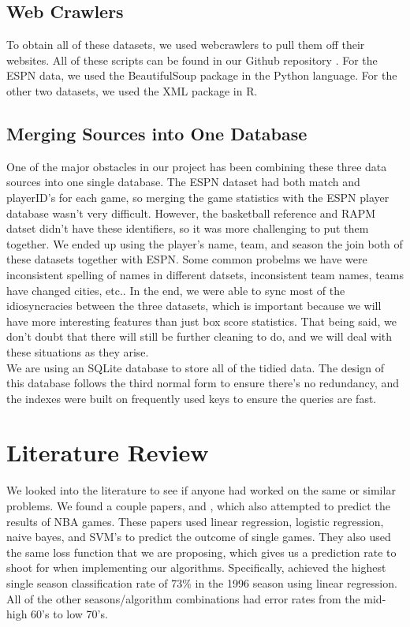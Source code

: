 \documentclass{article}
\begin{document}
	\subsection{Web Crawlers}
	To obtain all of these datasets, we used webcrawlers to pull them off their websites. All of these scripts can be found in our Github repository \cite{gitrepo}. For the ESPN data, we used the BeautifulSoup package in the Python language. For the other two datasets, we used the XML package in R. \\

	\subsection{Merging Sources into One Database}
	One of the major obstacles in our project has been combining these three data sources into one single database. The ESPN dataset had both match and playerID's for each game, so merging the game statistics with the ESPN player database wasn't very difficult. However, the basketball reference and RAPM datset didn't have these identifiers, so it was more challenging to put them together. We ended up using the player's name, team, and season the join both of these datasets together with ESPN. Some common probelms we have were inconsistent spelling of names in different datsets, inconsistent team names, teams have changed cities, etc.. In the end, we were able to sync most of the idiosyncracies between the three datasets, which is important because we will have more interesting features than just box score statistics. That being said, we don't doubt that there will still be further cleaning to do, and we will deal with these situations as they arise. \\

	We are using an SQLite database to store all of the tidied data. The design of this database follows the third normal form to ensure there's no redundancy, and the indexes were built on frequently used keys to ensure the queries are fast. 

\section{Literature Review}
	We looked into the literature to see if anyone had worked on the same or similar problems. We found a couple papers, \cite{nba_oracle} and \cite{data_mining}, which also attempted to predict the results of NBA games. These papers used linear regression, logistic regression, naive bayes, and SVM's to predict the outcome of single games. They also used the same loss function that we are proposing, which gives us a prediction rate to shoot for when implementing our algorithms. Specifically, \cite{nba_oracle} achieved the highest single season classification rate of 73\% in the 1996 season using linear regression. All of the other seasons/algorithm combinations had error rates from the mid-high 60's to low 70's. \\
\end{document}
